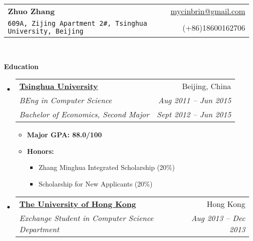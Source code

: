 \documentclass[letterpaper,11pt]{article}
\makeatletter
\newcommand{\resitem}[1]{\item #1 \vspace{-2pt}}
\newcommand{\resheading}[1]{{\large \colorbox{mygrey}{\begin{minipage}{\textwidth}{\textbf{#1 \vphantom{p\^{E}}}}\end{minipage}}}}
\newcommand{\ressubheading}[4]{
\begin{tabular*}{6.5in}{l@{\extracolsep{\fill}}r}
        \textbf{#1} & #2 \\
        \textit{#3} & \textit{#4} \\
\end{tabular*}\vspace{-6pt}}
\newcommand{\ressubheadingg}[6]{
\begin{tabular*}{6.5in}{l@{\extracolsep{\fill}}r}
        \textbf{#1} & #2 \\
        \textit{#3} & \textit{#4} \\
        \textit{#5} & \textit{#6} \\
\end{tabular*}\vspace{-6pt}}
\makeatother
\begin{document}
\newcommand{\mywebheader}{
\begin{tabular*}{7in}{l@{\extracolsep{\fill}}r}
    \textbf{{\LARGE Zhuo Zhang}} & \href{mailto:mycinbrin@gmail.com}{mycinbrin@gmail.com}\\
    {\footnotesize \texttt{609A, Zijing Apartment 2\#, Tsinghua University, Beijing}} & {(+86)18600162706}
    \end{tabular*}
\\
\vspace{0.1in}}

\mywebheader

\resheading{Education}
    \begin{itemize}
            \item
                \ressubheadingg{\href{http://www.tsinghua.edu.cn}{Tsinghua University}}{Beijing, China}{{BEng in Computer Science}}{Aug 2011 -- Jun 2015}{Bachelor of Economics, Second Major}{Sept 2012 -- Jun 2015}
                { \footnotesize
                \begin{itemize}
                        \resitem{\textbf{Major GPA: 88.0/100}}
                        \resitem{\textbf{Honors:}} 
                        \begin{itemize}
                                \resitem{Zhang Minghua Integrated Scholarship (20\%) }
                                \resitem{Scholarship for New Applicants (20\%) }
                        \end{itemize}
                \end{itemize}
                }
            \item
                \ressubheading{\href{http://www.hku.hku}{The University of Hong Kong}}{Hong Kong}{Exchange Student in Computer Science Department}{Aug 2013 -- Dec 2013}{}
    \end{itemize} %
\end{document}
